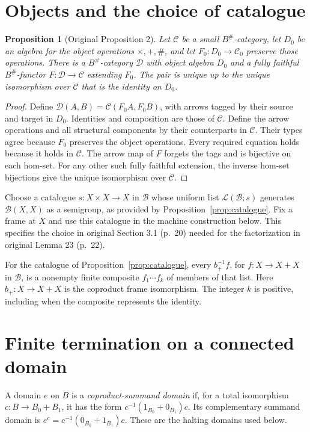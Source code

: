 \documentclass[11pt]{article}
\newtheorem{proposition}[theorem]{Proposition}
\newcommand{\C}{\mathcal C}\newcommand{\D}{\mathcal D}\newcommand{\B}{\mathcal B}
\begin{document}
\section{Objects and the choice of catalogue}\label{sec:objects}
\begin{proposition}[Original Proposition 2]\label{prop:formal-objects}
Let $\C$ be a small $B^\#$-category, let $D_0$ be an algebra for the object operations $\times,+,\#$, and let $F_0:D_0\to\C_0$ preserve those operations. There is a $B^\#$-category $\D$ with object algebra $D_0$ and a fully faithful $B^\#$-functor $F:\D\to\C$ extending $F_0$. The pair is unique up to the unique isomorphism over $\C$ that is the identity on $D_0$.
\end{proposition}
\begin{proof}
Define $\D(A,B)=\C(F_0A,F_0B)$, with arrows tagged by their source and target in $D_0$. Identities and composition are those of $\C$. Define the arrow operations and all structural components by their counterparts in $\C$. Their types agree because $F_0$ preserves the object operations. Every required equation holds because it holds in $\C$. The arrow map of $F$ forgets the tags and is bijective on each hom-set. For any other such fully faithful extension, the inverse hom-set bijections give the unique isomorphism over $\C$.
\end{proof}

Choose a catalogue $s:X\times X\to X$ in $\B$ whose uniform list $\mathcal L(\B;s)$ generates $\B(X,X)$ as a semigroup, as provided by Proposition~\ref{prop:catalogue}. Fix a frame at $X$ and use this catalogue in the machine construction below. This specifies the choice in original Section 3.1 (p.~20) needed for the factorization in original Lemma 23 (p.~22).

For the catalogue of Proposition~\ref{prop:catalogue}, every $b_+^{-1}f$, for $f:X\to X+X$ in $\B$, is a nonempty finite composite $f_1\cdots f_k$ of members of that list. Here $b_+:X\to X+X$ is the coproduct frame isomorphism. The integer $k$ is positive, including when the composite represents the identity.

\section{Finite termination on a connected domain}\label{sec:termination}
A domain $e$ on $B$ is a \emph{coproduct-summand domain} if, for a total isomorphism $c:B\to B_0+B_1$, it has the form $c^{-1}(1_{B_0}+0_{B_1})c$. Its complementary summand domain is $e^c=c^{-1}(0_{B_0}+1_{B_1})c$. These are the halting domains used below.
\end{document}
